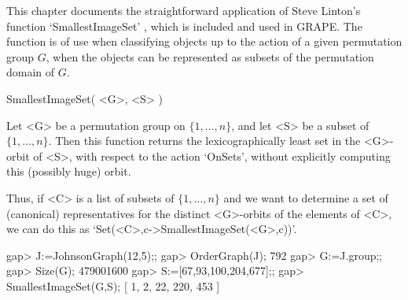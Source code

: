 %
%
%
%
\def\GRAPE{\sf GRAPE}
\def\nauty{\it nauty}
\def\G{\Gamma}
\def\Aut{{\rm Aut}\,}
\def\x{\times}

This chapter documents the straightforward application of Steve Linton's
function `SmallestImageSet' \cite{Lin04}, which is included and used
in {\GRAPE}. The function is of use when classifying objects up to
the action of a given permutation group $G$, when the objects can be
represented as subsets of the permutation domain of $G$.


\>SmallestImageSet( <G>, <S> )

Let <G> be a permutation group on $\{1,\ldots,n\}$, and let <S>
be a subset of $\{1,\ldots,n\}$. Then this function returns the
lexicographically least set in the <G>-orbit of <S>, with respect to the
action `OnSets', without explicitly computing this (possibly huge) orbit.

Thus, if <C> is a list of subsets of $\{1,\ldots,n\}$ and we
want to determine a set of (canonical) representatives for the
distinct <G>-orbits of the elements of <C>, we can do this as
`Set(<C>,c->SmallestImageSet(<G>,c))'.

\beginexample
gap> J:=JohnsonGraph(12,5);;
gap> OrderGraph(J);
792
gap> G:=J.group;;
gap> Size(G);
479001600
gap> S:=[67,93,100,204,677];;
gap> SmallestImageSet(G,S);
[ 1, 2, 22, 220, 453 ]
\endexample

